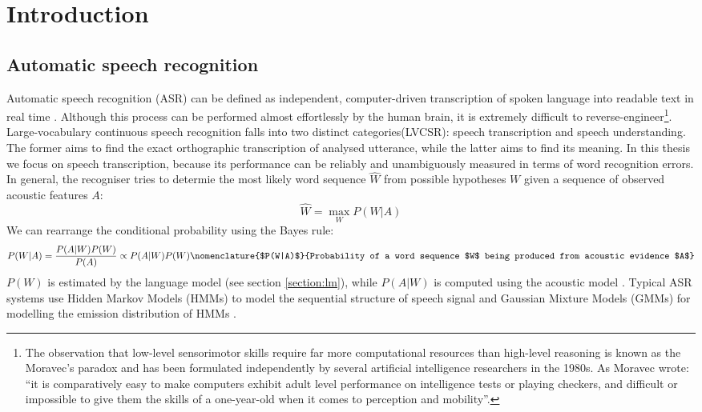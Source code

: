 \chapter{Introduction}
\label{chapter:intro}

\section{Automatic speech recognition}
\label{section:asr}
Automatic speech recognition (ASR)  can be defined as independent, computer-driven transcription of spoken language into readable text in real time \cite{stuckless1994developments, jelinek1997statistical}. Although this process can be performed almost effortlessly by the human brain, it is extremely difficult to reverse-engineer\footnote{The observation that low-level sensorimotor skills require far more computational resources than high-level reasoning is known as the Moravec's paradox and has been formulated independently by several artificial intelligence researchers in the 1980s. As Moravec wrote: ``it is comparatively easy to make computers exhibit adult level performance on intelligence tests or playing checkers, and difficult or impossible to give them the skills of a one-year-old when it comes to perception and mobility''\cite{moravec1988mind}.}. Large-vocabulary continuous speech recognition falls into two distinct categories(LVCSR): speech transcription and speech understanding. The former aims to find the exact orthographic transcription of analysed utterance, while the latter aims to find its meaning. In this thesis we focus on speech transcription, because its performance can be reliably and unambiguously measured in terms of word recognition errors. In general, the recogniser tries to determie the most likely word sequence $\hat{W}$ from possible hypotheses $W$ given a sequence of observed acoustic features $A$:
\begin{equation}
\label{equation:recogniser}
  \hat{W}=\max_{W}P(W|A)
\end{equation}
We can rearrange the conditional probability using the Bayes rule:
\begin{equation}
  \label{equation:bayesian}
  P(W|A)=\frac{P(A|W)P(W)}{P(A)}\propto{P(A|W)P(W)}
  \nomenclature{$P(W|A)$}{Probability of a word sequence $W$ being produced from acoustic evidence $A$}
\end{equation}
$P(W)$ is estimated by the language model (see section \ref{section:lm}), while $P(A|W)$ is computed using the acoustic model \cite{whittaker2000statistical}. Typical ASR systems use Hidden Markov Models (HMMs)  to model the sequential structure of speech signal \cite{juang1985mixture, baker1975dragon} and Gaussian Mixture Models (GMMs)  for modelling the emission distribution of HMMs \cite{mohamed2012acoustic, bourlard1994connectionist}.
